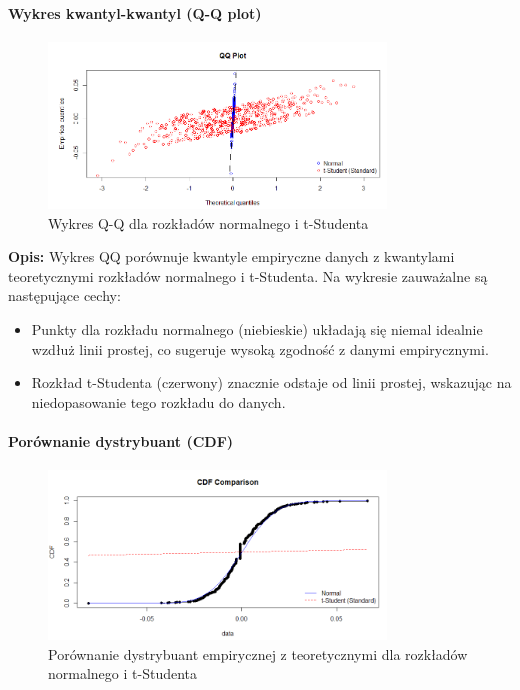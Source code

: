 \documentclass[a4paper,11pt]{article}
\begin{document}
\paragraph{Wykres kwantyl-kwantyl (Q-Q plot)}

\begin{figure}[H]
    \centering
    \includegraphics[width=0.8\textwidth]{./Wojtek/wykres-kwantyl-kwantyl.png}
    \caption{Wykres Q-Q dla rozkładów normalnego i t-Studenta}
    \label{fig:qq_plot}
\end{figure}

\textbf{Opis:} Wykres QQ porównuje kwantyle empiryczne danych z kwantylami teoretycznymi rozkładów normalnego i t-Studenta.  
Na wykresie zauważalne są następujące cechy:
\begin{itemize}
    \item Punkty dla rozkładu normalnego (niebieskie) układają się niemal idealnie wzdłuż linii prostej, co sugeruje wysoką zgodność z danymi empirycznymi.
    \item Rozkład t-Studenta (czerwony) znacznie odstaje od linii prostej, wskazując na niedopasowanie tego rozkładu do danych.
\end{itemize}

\paragraph{Porównanie dystrybuant (CDF)}

\begin{figure}[H]
    \centering
    \includegraphics[width=0.8\textwidth]{./Wojtek/dystrybuanta-empiryczna-vs-teoretyczna.png}
    \caption{Porównanie dystrybuant empirycznej z teoretycznymi dla rozkładów normalnego i t-Studenta}
    \label{fig:dystrybuanta_vs_teoretyczna}
\end{figure}
\end{document}
